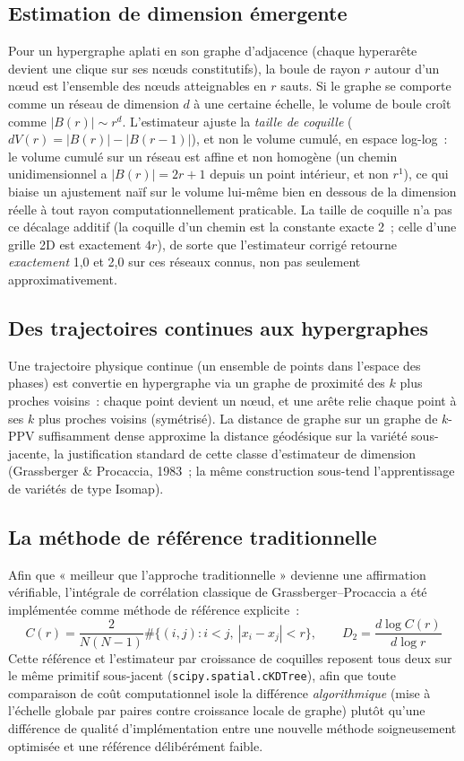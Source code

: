 \documentclass[11pt,a4paper]{article}
\begin{document}
\subsection{Estimation de dimension émergente}

Pour un hypergraphe aplati en son graphe d'adjacence (chaque hyperarête
devient une clique sur ses nœuds constitutifs), la boule de rayon $r$
autour d'un nœud est l'ensemble des nœuds atteignables en $r$ sauts. Si le
graphe se comporte comme un réseau de dimension $d$ à une certaine échelle,
le volume de boule croît comme $|B(r)| \sim r^d$. L'estimateur ajuste la
\emph{taille de coquille} ($dV(r) = |B(r)| - |B(r-1)|$), et non le volume
cumulé, en espace log-log~: le volume cumulé sur un réseau est affine et
non homogène (un chemin unidimensionnel a $|B(r)| = 2r+1$ depuis un point
intérieur, et non $r^1$), ce qui biaise un ajustement naïf sur le volume
lui-même bien en dessous de la dimension réelle à tout rayon
computationnellement praticable. La taille de coquille n'a pas ce décalage
additif (la coquille d'un chemin est la constante exacte 2~; celle d'une
grille 2D est exactement $4r$), de sorte que l'estimateur corrigé retourne
\emph{exactement} 1,0 et 2,0 sur ces réseaux connus, non pas seulement
approximativement.

\subsection{Des trajectoires continues aux hypergraphes}

Une trajectoire physique continue (un ensemble de points dans l'espace des
phases) est convertie en hypergraphe via un graphe de proximité des $k$
plus proches voisins~: chaque point devient un nœud, et une arête relie
chaque point à ses $k$ plus proches voisins (symétrisé). La distance de
graphe sur un graphe de $k$-PPV suffisamment dense approxime la distance
géodésique sur la variété sous-jacente, la justification standard de cette
classe d'estimateur de dimension (Grassberger \& Procaccia, 1983~; la même
construction sous-tend l'apprentissage de variétés de type Isomap).

\subsection{La méthode de référence traditionnelle}

Afin que « meilleur que l'approche traditionnelle » devienne une
affirmation vérifiable, l'intégrale de corrélation classique de
Grassberger--Procaccia a été implémentée comme méthode de référence
explicite~:
\[
C(r) = \frac{2}{N(N-1)} \#\{(i,j) : i<j,\ |x_i - x_j| < r\}, \qquad
D_2 = \frac{d \log C(r)}{d \log r}
\]
Cette référence et l'estimateur par croissance de coquilles reposent tous
deux sur le même primitif sous-jacent (\texttt{scipy.spatial.cKDTree}),
afin que toute comparaison de coût computationnel isole la différence
\emph{algorithmique} (mise à l'échelle globale par paires contre
croissance locale de graphe) plutôt qu'une différence de qualité
d'implémentation entre une nouvelle méthode soigneusement optimisée et une
référence délibérément faible.
\end{document}
